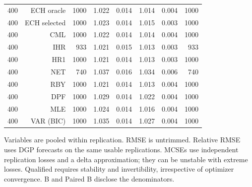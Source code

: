 \begin{table}[p]
\begin{tabular}{rrrrrrrr}
400 & ECH oracle & 1000 & 1.022 & 0.014 & 1.014 & 0.004 & 1000 \\
400 & ECH selected & 1000 & 1.023 & 0.014 & 1.015 & 0.003 & 1000 \\
400 & CML & 1000 & 1.022 & 0.014 & 1.014 & 0.004 & 1000 \\
400 & IHR &  933 & 1.021 & 0.015 & 1.013 & 0.003 &  933 \\
400 & HR1 & 1000 & 1.021 & 0.014 & 1.013 & 0.003 & 1000 \\
400 & NET &  740 & 1.037 & 0.016 & 1.034 & 0.006 &  740 \\
400 & RBY & 1000 & 1.021 & 0.014 & 1.013 & 0.004 & 1000 \\
400 & DPF & 1000 & 1.029 & 0.014 & 1.022 & 0.004 & 1000 \\
400 & MLE & 1000 & 1.024 & 0.014 & 1.016 & 0.004 & 1000 \\
400 & VAR (BIC) & 1000 & 1.035 & 0.014 & 1.027 & 0.004 & 1000 \\
\bottomrule\end{tabular}
\par\medskip
\begin{minipage}{0.98\linewidth}\footnotesize Variables are pooled within replication. RMSE is untrimmed. Relative RMSE uses DGP forecasts on the same usable replications. MCSEs use independent replication losses and a delta approximation; they can be unstable with extreme losses. Qualified requires stability and invertibility, irrespective of optimizer convergence. B and Paired B disclose the denominators.\end{minipage}
\end{table}
